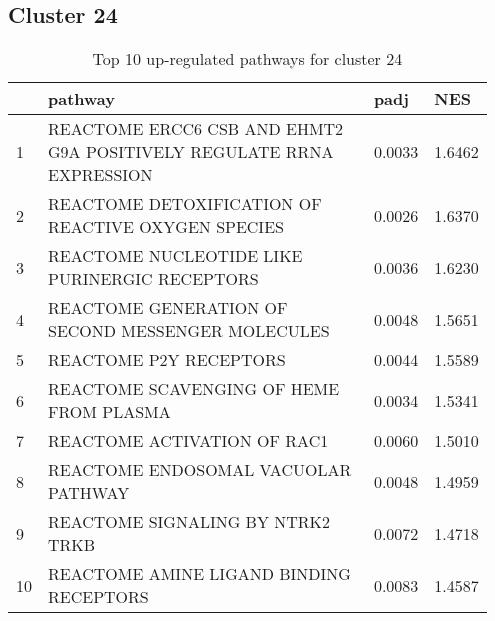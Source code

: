\documentclass{article}
\begin{document}
\subsection{Cluster 24 }
\begin{table}[H]
\centering
\begin{tabular}{p{0.05\linewidth}p{0.7\linewidth}p{0.1\linewidth}p{0.1\linewidth}}
  \hline
 & pathway & padj & NES \\ 
  \hline
1 & REACTOME ERCC6 CSB AND EHMT2 G9A POSITIVELY REGULATE RRNA EXPRESSION & 0.0033 & 1.6462 \\ 
  2 & REACTOME DETOXIFICATION OF REACTIVE OXYGEN SPECIES & 0.0026 & 1.6370 \\ 
  3 & REACTOME NUCLEOTIDE LIKE PURINERGIC RECEPTORS & 0.0036 & 1.6230 \\ 
  4 & REACTOME GENERATION OF SECOND MESSENGER MOLECULES & 0.0048 & 1.5651 \\ 
  5 & REACTOME P2Y RECEPTORS & 0.0044 & 1.5589 \\ 
  6 & REACTOME SCAVENGING OF HEME FROM PLASMA & 0.0034 & 1.5341 \\ 
  7 & REACTOME ACTIVATION OF RAC1 & 0.0060 & 1.5010 \\ 
  8 & REACTOME ENDOSOMAL VACUOLAR PATHWAY & 0.0048 & 1.4959 \\ 
  9 & REACTOME SIGNALING BY NTRK2 TRKB & 0.0072 & 1.4718 \\ 
  10 & REACTOME AMINE LIGAND BINDING RECEPTORS & 0.0083 & 1.4587 \\ 
   \hline
\end{tabular}
\caption{Top 10 up-regulated pathways for cluster 24} 
\label{tab:q3_2_24}
\end{table}
\end{document}
